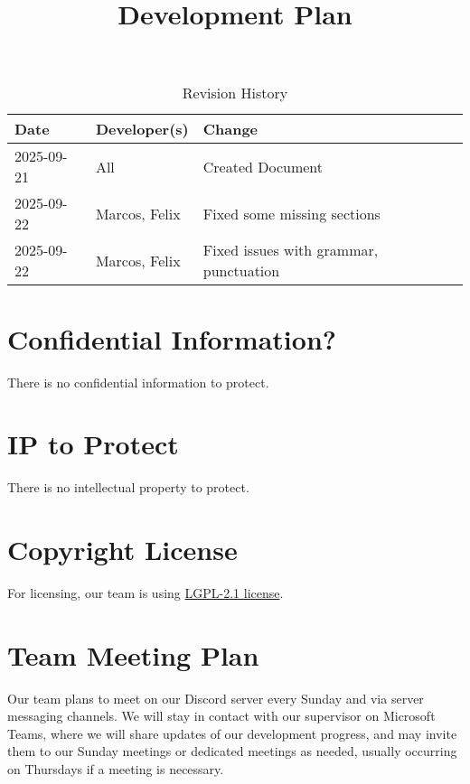 \documentclass{article}
\title{Development Plan\\\progname}
\author{\authname}
\date{}
\begin{document}
\maketitle

\begin{table}[hp]
\caption{Revision History} \label{TblRevisionHistory}
\begin{tabularx}{\textwidth}{llX}
\toprule
\textbf{Date} & \textbf{Developer(s)} & \textbf{Change}\\
\midrule
2025-09-21 & All & Created Document\\
2025-09-22 & Marcos, Felix & Fixed some missing sections\\
2025-09-22 & Marcos, Felix & Fixed issues with grammar, punctuation\\
\bottomrule
\end{tabularx}
\end{table}

\newpage{}

\tableofcontents

\section{Confidential Information?}

There is no confidential information to protect.

\section{IP to Protect}

There is no intellectual property to protect.

\section{Copyright License}

For licensing, our team is using \href{https://github.com/felix-hurst/Ad-Natura/blob/main/LICENSE}{LGPL-2.1 license}.

\section{Team Meeting Plan}


Our team plans to meet on our Discord server every Sunday and via server messaging channels. We will stay in contact with our supervisor on Microsoft Teams, where we will share updates of our development progress, and may invite them to our Sunday meetings or dedicated meetings as needed, usually occurring on Thursdays if a meeting is necessary. \\
\end{document}
